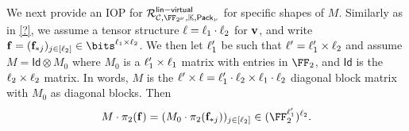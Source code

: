 \documentclass[11pt,letterpaper,usenames,dvipsnames]{article}
\begin{document}
We next provide an IOP for $\Relation^{\mathsf{lin-virtual}}_{\cC, \comfield, \evalfield, \pack}$ for specific shapes of $M$. Similarly as in \cref{?}, we assume a tensor structure $\ell=\ell_1 \cdot \ell_2$ for $\mathbf{v}$, and write $\bff = (\bff_{*j})_{j\in [\codedim_2]} \in \bits^{\codedim_1 \times \codedim_2}$.  We then let $\ell_1'$ be such that $\ell' = \ell_1' \times \ell_2$ and assume $M = \mathsf{Id} \otimes M_0$ where $M_0$ is a $\ell_1' \times \ell_1$ matrix with entries in $\FF_2$, and $\mathsf{Id}$ is the $\ell_2\times \ell_2$ matrix. In words, $M$ is the $\ell'\times \ell = \ell_1'\cdot \ell_2 \times \ell_1\cdot \ell_2$ diagonal block matrix with $M_0$ as diagonal blocks. Then
%
\begin{equation}\label{e:M_pi_f}
M \cdot \pi_2(\bff) = (M_0 \cdot \pi_2(\bff_{*j}))_{j\in [\codedim_2]} \in (\FF_2^{\codedim_1'})^{\codedim_2}.
\end{equation}
%
\end{document}

